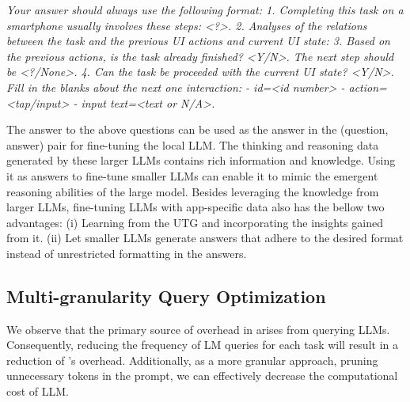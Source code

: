 \textit{Your answer should always use the following format:
1. Completing this task on a smartphone usually involves these steps: <?>.
2. Analyses of the relations between the task and the previous UI actions and current UI state: 
3. Based on the previous actions, is the task already finished? <Y/N>. The next step should be <?/None>.
4. Can the task be proceeded with the current UI state? <Y/N>. Fill in the blanks about the next one interaction: - id=<id number> - action=<tap/input> - input text=<text or N/A>.
}

The answer to the above questions can be used as the answer in the (question, answer) pair for fine-tuning the local LLM.
The thinking and reasoning data generated by these larger LLMs contains rich information and knowledge. Using it as answers to fine-tune smaller LLMs can enable it to mimic the emergent reasoning abilities of the large model.
Besides leveraging the knowledge from larger LLMs, fine-tuning LLMs with app-specific data also has the bellow two advantages: 
(i) Learning from the UTG and incorporating the insights gained from it. %
(ii) Let smaller LLMs generate answers that adhere to the desired format instead of unrestricted formatting in the answers.%

\subsection{Multi-granularity Query Optimization}
\label{section: query_optimization}
We observe that the primary source of overhead in \name arises from querying LLMs. 
Consequently, reducing the frequency of LM queries for each task will result in a reduction of \name's overhead.
Additionally, as a more granular approach, pruning unnecessary tokens in the prompt, we can effectively decrease the computational cost of LLM.


